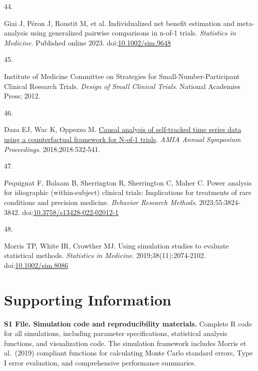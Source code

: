 \documentclass[
  11pt,
]{article}
\newlength{\cslhangindent}
\newlength{\csllabelwidth}
\newenvironment{CSLReferences}[2] %
 {\begin{list}{}{%
  \setlength{\itemindent}{0pt}
  \setlength{\leftmargin}{0pt}
  \setlength{\parsep}{0pt}
  \ifodd #1
   \setlength{\leftmargin}{\cslhangindent}
   \setlength{\itemindent}{-1\cslhangindent}
  \fi
  \setlength{\itemsep}{#2\baselineskip}}}
 {\end{list}}
\newcommand{\CSLLeftMargin}[1]{\parbox[t]{\csllabelwidth}{\strut#1\strut}}
\newcommand{\CSLRightInline}[1]{\parbox[t]{\linewidth - \csllabelwidth}{\strut#1\strut}}
\begin{document}
\begin{CSLReferences}{0}{1}
\CSLLeftMargin{44. }%
\CSLRightInline{Giai J, Péron J, Roustit M, et al. Individualized net
benefit estimation and meta-analysis using generalized pairwise
comparisons in n-of-1 trials. \emph{Statistics in Medicine}. Published
online 2023.
doi:\href{https://doi.org/10.1002/sim.9648}{10.1002/sim.9648}}

\CSLLeftMargin{45. }%
\CSLRightInline{Institute of Medicine Committee on Strategies for
Small-Number-Participant Clinical Research Trials. \emph{Design of Small
Clinical Trials}. National Academies Press; 2012.}

\CSLLeftMargin{46. }%
\CSLRightInline{Daza EJ, Wac K, Oppezzo M.
\href{https://www.ncbi.nlm.nih.gov/pmc/articles/PMC6087468}{Causal
analysis of self-tracked time series data using a counterfactual
framework for {N-of-1} trials}. \emph{AMIA Annual Symposium
Proceedings}. 2018;2018:532-541.}

\CSLLeftMargin{47. }%
\CSLRightInline{Pequignat F, Balaam B, Sherrington R, Sherrington C,
Maher C. Power analysis for idiographic (within-subject) clinical
trials: Implications for treatments of rare conditions and precision
medicine. \emph{Behavior Research Methods}. 2023;55:3824-3842.
doi:\href{https://doi.org/10.3758/s13428-022-02012-1}{10.3758/s13428-022-02012-1}}

\CSLLeftMargin{48. }%
\CSLRightInline{Morris TP, White IR, Crowther MJ. Using simulation
studies to evaluate statistical methods. \emph{Statistics in Medicine}.
2019;38(11):2074-2102.
doi:\href{https://doi.org/10.1002/sim.8086}{10.1002/sim.8086}}

\end{CSLReferences}

\section{Supporting Information}\label{supporting-information}

\textbf{S1 File. Simulation code and reproducibility materials.}
Complete R code for all simulations, including parameter specifications,
statistical analysis functions, and visualization code. The simulation
framework includes Morris et al.~(2019) compliant functions for
calculating Monte Carlo standard errors, Type I error evaluation, and
comprehensive performance summaries.
\end{document}
